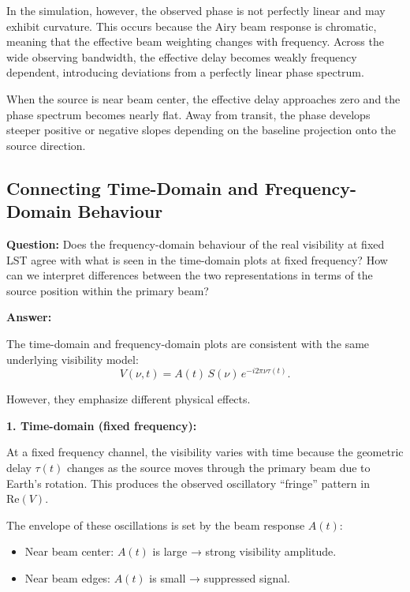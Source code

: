 \documentclass{article}
\begin{document}
\begin{itemize}
In the simulation, however, the observed phase is not perfectly linear and may exhibit curvature. This occurs because the Airy beam response is chromatic, meaning that the effective beam weighting changes with frequency. Across the wide observing bandwidth, the effective delay becomes weakly frequency dependent, introducing deviations from a perfectly linear phase spectrum.

When the source is near beam center, the effective delay approaches zero and the phase spectrum becomes nearly flat. Away from transit, the phase develops steeper positive or negative slopes depending on the baseline projection onto the source direction.

\end{itemize}

\subsection{Connecting Time-Domain and Frequency-Domain Behaviour}

\textbf{Question:}  
Does the frequency-domain behaviour of the real visibility at fixed LST agree with what is seen in the time-domain plots at fixed frequency? How can we interpret differences between the two representations in terms of the source position within the primary beam?

\vspace{1em}

\textbf{Answer:}

The time-domain and frequency-domain plots are consistent with the same underlying visibility model:
\[
V(\nu,t) = A(t)\,S(\nu)\,e^{-i2\pi\nu\tau(t)}.
\]

However, they emphasize different physical effects.

\vspace{0.5em}
\textbf{1. Time-domain (fixed frequency):}

At a fixed frequency channel, the visibility varies with time because the geometric delay $\tau(t)$ changes as the source moves through the primary beam due to Earth’s rotation. This produces the observed oscillatory “fringe” pattern in $\mathrm{Re}(V)$.

The envelope of these oscillations is set by the beam response $A(t)$:
\begin{itemize}
    \item Near beam center: $A(t)$ is large → strong visibility amplitude.
    \item Near beam edges: $A(t)$ is small → suppressed signal.
\end{itemize}
\end{document}
